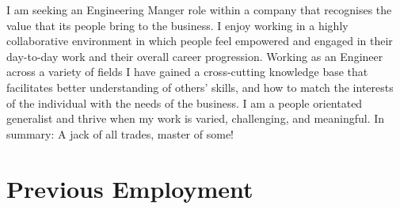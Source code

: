 \documentclass[]{deedy-resume-openfont-wjl}
\begin{document}
%
%


%
%
\begin{center}
  \vspace{-\topsep} %
  \huge\color{subheadings}
\end{center}

I am seeking an Engineering Manger role within a company that recognises the value that its people bring to the business.
I enjoy working in a highly collaborative environment in which people feel empowered and engaged in their day-to-day work and their overall career progression.
Working as an Engineer across a variety of fields I have gained a cross-cutting knowledge base that facilitates better understanding of others' skills, and how to match the interests of the individual with the needs of the business.
I am a people orientated generalist and thrive when my work is varied, challenging, and meaningful.
In summary: A jack of all trades, master of some!

%
%
\sectionsep
\section{Previous Employment}









% 
\end{document}
